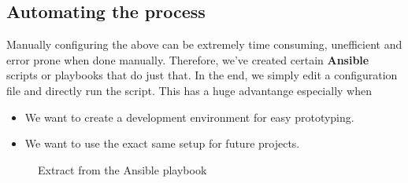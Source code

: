 \subsection{Automating the process}
Manually configuring the above can be extremely time consuming, unefficient and error prone when done manually.
Therefore, we've created certain {\bf Ansible} scripts or playbooks that do just that. In the end, we simply edit a configuration file and directly run the script.
This has a huge advantange especially when
\begin{itemize}
    \item We want to create a development environment for easy prototyping.
    \item We want to use the exact same setup for future projects.
\end{itemize}

\begin{figure}[H]
    \centering
    \caption{Extract from the Ansible playbook}
    \label{fig:extract-from-ansible-playbook}
\end{figure}


